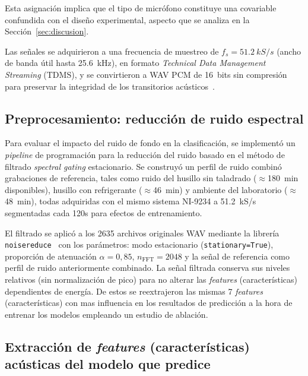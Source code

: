 \documentclass[10pt,twocolumn]{article}
\begin{document}
\noindent Esta asignación implica que el tipo de micrófono constituye una
covariable confundida con el diseño experimental, aspecto que se analiza
en la Sección~\ref{sec:discusion}.

Las señales se adquirieron a una frecuencia de muestreo de
$f_s = \SI{51.2}{kS/s}$ (ancho de banda útil hasta \SI{25.6}{kHz}),
en formato \textit{Technical Data Management Streaming} (TDMS), y se convirtieron a WAV PCM de 16~bits sin compresión
para preservar la integridad de los transitorios
acústicos~\cite{macphail2024}.

\subsection{Preprocesamiento: reducción de ruido espectral}
\label{sec:noisereduce}

Para evaluar el impacto del ruido de fondo en la clasificación, se
implementó un \textit{pipeline} de programación para la reducción del ruido 
basado en el método de filtrado
\textit{spectral gating} estacionario. Se construyó un perfil de ruido
combinó grabaciones de referencia, tales como
ruido del husillo sin taladrado ($\approx$\SI{180}{min} disponibles),
husillo con refrigerante ($\approx$\SI{46}{min}) y ambiente del
laboratorio ($\approx$\SI{48}{min}), todas adquiridas con el mismo sistema
NI-9234 a \SI{51.2}{kS/s} segmentadas cada 120s para efectos de entrenamiento.

El filtrado se aplicó a los 2635 archivos originales WAV mediante la librería
\texttt{noisereduce}~\cite{sainburg2020} con los parámetros: modo
estacionario (\texttt{stationary=True}), proporción de atenuación
$\alpha = 0{,}85$, $n_{\text{FFT}} = 2048$ y la señal de referencia como
perfil de ruido anteriormente combinado. La señal filtrada conserva sus niveles relativos
(sin normalización de pico) para no alterar las \textit{features} (características)
dependientes de energía. De estos se reextrajeron las mismas 7 \textit{features} (características) con mas influencia en los 
resultados de predicción a la hora de entrenar los modelos empleando un estudio de ablación.

\subsection{Extracción de \textit{features} (características) acústicas del modelo que predice}
\end{document}
